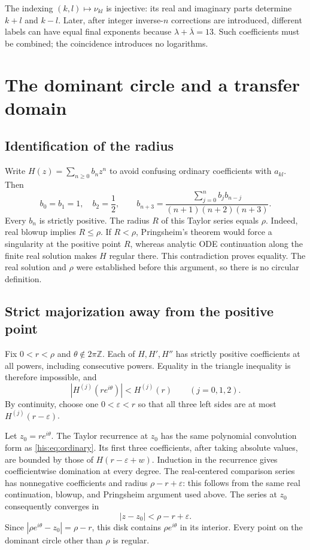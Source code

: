 \documentclass[11pt]{article}
\theoremstyle{remark}\newtheorem{remark}[theorem]{Remark}
\newcommand{\eps}{\varepsilon}
\newcommand{\la}{\lambda}
\newcommand{\lab}{{\overline{\lambda}}}
\numberwithin{equation}{section}
\begin{document}
The indexing $(k,l)\mapsto\nu_{kl}$ is injective: its real and imaginary parts determine $k+l$ and $k-l$. Later, after integer inverse-$n$ corrections are introduced, different labels can have equal final exponents because $\la+\lab=13$. Such coefficients must be combined; the coincidence introduces no logarithms.

\section{The dominant circle and a transfer domain}\label{his:sec:circle}
\subsection{Identification of the radius}
Write $H(z)=\sum_{n\ge0}b_nz^n$ to avoid confusing ordinary coefficients with $a_{kl}$. Then
\begin{equation}\label{his:eq:ordinary}
 b_0=b_1=1,\quad b_2=\frac12,\qquad
 b_{n+3}=\frac{\sum_{j=0}^nb_jb_{n-j}}{(n+1)(n+2)(n+3)}.
\end{equation}
Every $b_n$ is strictly positive. The radius $R$ of this Taylor series equals $\rho$. Indeed, real blowup implies $R\le\rho$. If $R<\rho$, Pringsheim's theorem would force a singularity at the positive point $R$, whereas analytic ODE continuation along the finite real solution makes $H$ regular there. This contradiction proves equality. The real solution and $\rho$ were established before this argument, so there is no circular definition.

\subsection{Strict majorization away from the positive point}
Fix $0<r<\rho$ and $\theta\notin2\pi\mathbb Z$. Each of $H,H',H''$ has strictly positive coefficients at all powers, including consecutive powers. Equality in the triangle inequality is therefore impossible, and
\begin{equation}\label{his:eq:strict}
 |H^{(j)}(re^{i\theta})|<H^{(j)}(r)\qquad(j=0,1,2).
\end{equation}
By continuity, choose one $0<\eps<r$ so that all three left sides are at most $H^{(j)}(r-\eps)$.

Let $z_0=re^{i\theta}$. The Taylor recurrence at $z_0$ has the same polynomial convolution form as \eqref{his:eq:ordinary}. Its first three coefficients, after taking absolute values, are bounded by those of $H(r-\eps+w)$. Induction in the recurrence gives coefficientwise domination at every degree. The real-centered comparison series has nonnegative coefficients and radius $\rho-r+\eps$: this follows from the same real continuation, blowup, and Pringsheim argument used above. The series at $z_0$ consequently converges in
\begin{equation}\label{his:eq:disk}
 |z-z_0|<\rho-r+\eps.
\end{equation}
Since $|\rho e^{i\theta}-z_0|=\rho-r$, this disk contains $\rho e^{i\theta}$ in its interior. Every point on the dominant circle other than $\rho$ is regular.
\end{document}
